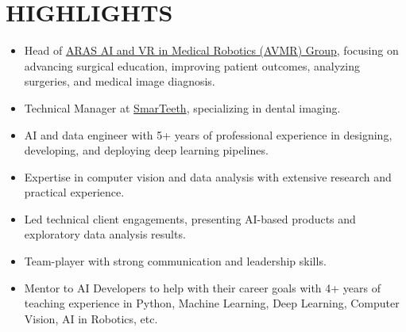 \documentclass[11pt,a4paper,sans]{moderncv} %
\begin{document}
    \section{HIGHLIGHTS}
    \begin{itemize}
 \item Head of \href{https://aras.kntu.ac.ir/ai}{ARAS AI and VR in Medical Robotics (AVMR) Group}, focusing on advancing surgical education, improving patient outcomes, analyzing surgeries, and medical image diagnosis.
\item Technical Manager at  \href{https://smarteeth.ai/}{SmarTeeth}, specializing in dental imaging.
\item AI and data engineer with 5+ years of professional experience in designing, developing, and deploying deep learning pipelines.
\item Expertise in computer vision and data analysis with extensive research and practical experience.
\item Led technical client engagements, presenting AI-based products and exploratory data analysis results.
\item Team-player with strong communication and leadership skills.
\item Mentor to AI Developers to help with their career goals with 4+ years of teaching experience in Python, Machine Learning, Deep Learning, Computer Vision, AI in Robotics, etc.
\end{itemize}
	
\end{document}
